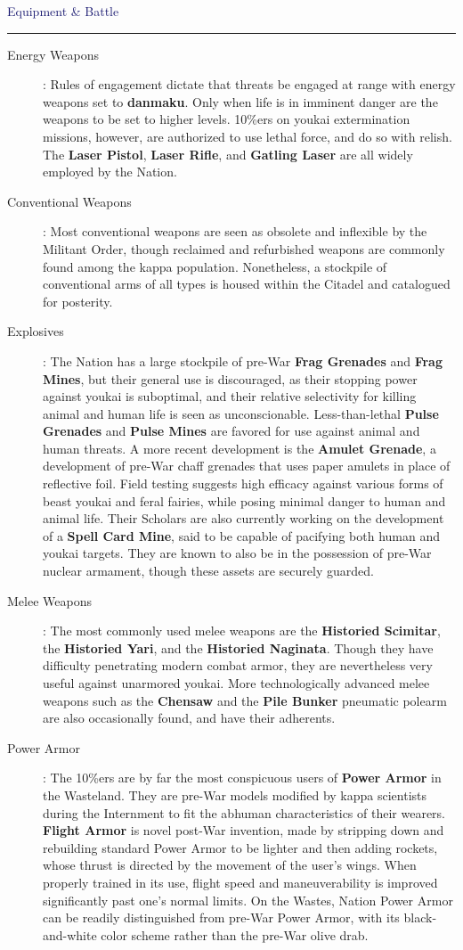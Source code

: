 \documentclass[a4paper,12pt]{book}
\newcommand{\factionheading}[1]{
\parbox{\textwidth}{
        \vspace{2mm}
        \noindent
        \textcolor{MidnightBlue}{
{\large {#1}
        \vspace*{1mm}
        \hrule}
        \vspace*{3mm}
        \noindent
} } }
\begin{document}
\factionheading{Equipment \& Battle}
\begin{description}
\item[Energy Weapons]: Rules of engagement dictate that threats be engaged at range with energy weapons set to \textbf{danmaku}. Only when life is in imminent danger are the weapons to be set to higher levels. 10\%ers on youkai extermination missions, however, are authorized to use lethal force, and do so with relish. The \textbf{Laser Pistol}, \textbf{Laser Rifle}, and \textbf{Gatling Laser} are all widely employed by the Nation.
\item[Conventional Weapons]: Most conventional weapons are seen as obsolete and inflexible by the Militant Order, though reclaimed and refurbished weapons are commonly found among the kappa population. Nonetheless, a stockpile of conventional arms of all types is housed within the Citadel and catalogued for posterity.
\item[Explosives]: The Nation has a large stockpile of pre-War \textbf{Frag Grenades} and \textbf{Frag Mines}, but their general use is discouraged, as their stopping power against youkai is suboptimal, and their relative selectivity for killing animal and human life is seen as unconscionable. Less-than-lethal \textbf{Pulse Grenades} and \textbf{Pulse Mines} are favored for use against animal and human threats. A more recent development is the \textbf{Amulet Grenade}, a development of pre-War chaff grenades that uses paper amulets in place of reflective foil. Field testing suggests high efficacy against various forms of beast youkai and feral fairies, while posing minimal danger to human and animal life. Their Scholars are also currently working on the development of a \textbf{Spell Card Mine}, said to be capable of pacifying both human and youkai targets. They are known to also be in the possession of pre-War nuclear armament, though these assets are securely guarded.
\item[Melee Weapons]: The most commonly used melee weapons are the \textbf{Historied Scimitar}, the \textbf{Historied Yari}, and the \textbf{Historied Naginata}. Though they have difficulty penetrating modern combat armor, they are nevertheless very useful against unarmored youkai. More technologically advanced melee weapons such as the \textbf{Chensaw} and the \textbf{Pile Bunker} pneumatic polearm are also occasionally found, and have their adherents.
\item[Power Armor]: The 10\%ers are by far the most conspicuous users of \textbf{Power Armor} in the Wasteland. They are pre-War models modified by kappa scientists during the Internment to fit the abhuman characteristics of their wearers. \textbf{Flight Armor} is novel post-War invention, made by stripping down and rebuilding standard Power Armor to be lighter and then adding rockets, whose thrust is directed by the movement of the user's wings. When properly trained in its use, flight speed and maneuverability is improved significantly past one's normal limits. On the Wastes, Nation Power Armor can be readily distinguished from pre-War Power Armor, with its black-and-white color scheme rather than the pre-War olive drab.
\end{description}
\end{document}
